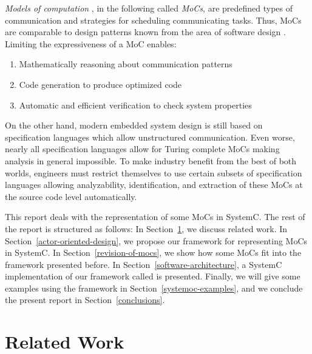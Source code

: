 \emph{Models of computation}
\cite{embsft:2002}, in the following called \emph{MoCs}, are
predefined types of communication and strategies for scheduling
communicating tasks. Thus, MoCs are comparable to design
patterns known from the area of software design \cite{gamma:1995}.
Limiting the expressiveness of a MoC enables:

\begin{enumerate}
\item Mathematically reasoning about communication patterns

\item Code generation to produce optimized code

\item Automatic and efficient verification to check system properties
\end{enumerate}

On the other hand, modern embedded system design is still based on
specification languages which allow unstructured communication.
Even worse, nearly all specification languages allow for Turing
complete MoCs making analysis in general impossible.
To make industry benefit from the best of both worlds,
engineers must restrict themselves to use certain subsets of
specification languages allowing analyzability, identification,
and extraction of these MoCs at the source code level automatically.

This report deals with the representation of some %
MoCs in SystemC. The rest of the report is structured as follows:
In Section~\ref{related-work}, we discuss related work. In
Section~\ref{actor-oriented-design}, we propose our framework for
representing MoCs in SystemC. In Section~\ref{revision-of-mocs},
we show how some MoCs fit into
the framework presented before. In Section~\ref{software-architecture},
a SystemC implementation of our framework called \SysteMoC{} is
presented. Finally, we will give some examples using the \SysteMoC{}
framework in Section~\ref{systemoc-examples}, and we conclude
the present report in Section~\ref{conclusions}.

\section{Related Work}\label{related-work}

